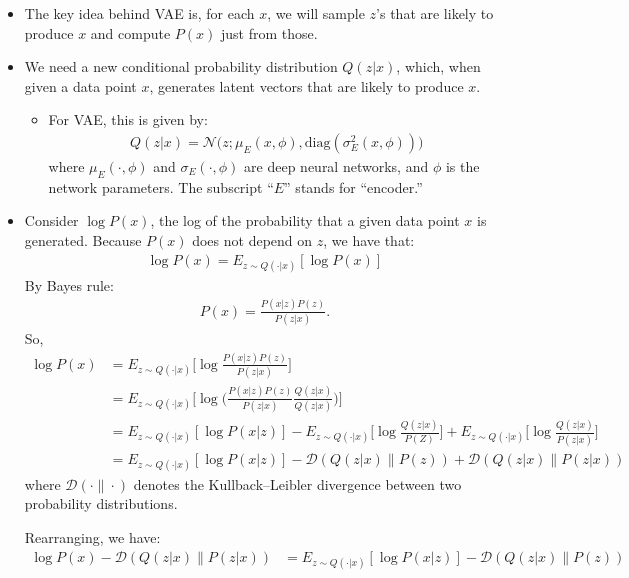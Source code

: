 \documentclass[10pt]{article}
\newcommand{\diag}{\mathrm{diag}}
\begin{document}
  \begin{itemize}
  	\item The key idea behind VAE is, for each $x$, we will sample $z$'s that are likely to produce $x$ and compute $P(x)$ just from those.

  	\item We need a new conditional probability distribution $Q(z|x)$, which, when given a data point $x$, generates latent vectors that are likely to produce $x$.
  	\begin{itemize}
  	  \item For VAE, this is given by:
  	  \begin{align*}
  	  	Q(z|x) = \mathcal{N}\big(z; \mu_E(x,\phi), \diag(\sigma^2_E(x,\phi))\big)
  	  \end{align*}
  	  where $\mu_E(\cdot, \phi)$ and $\sigma_E(\cdot, \phi)$ are deep neural networks, and $\phi$ is the network parameters. The subscript ``$E$'' stands for ``encoder.''
  	\end{itemize}

  	\item Consider $\log P(x)$, the log of the probability that a given data point $x$ is generated. Because $P(x)$ does not depend on $z$, we have that:
  	\begin{align*}
  	  \log P(x) = E_{z \sim Q(\cdot|x)} [\log P(x)]
  	\end{align*}
  	By Bayes rule:
  	\begin{align*}
  	  P(x) = \frac{P(x|z) P(z)}{P(z|x)}.
  	\end{align*}
  	So,
  	\begin{align*}
  	  \log P(x) 
  	  &= E_{z \sim Q(\cdot|x)} \bigg[\log \frac{P(x|z) P(z)}{P(z|x)} \bigg] \\
  	  &= E_{z \sim Q(\cdot|x)} \bigg[\log \bigg( \frac{P(x|z) P(z)}{P(z|x)} \frac{Q(z|x)}{Q(z|x)} \bigg) \bigg] \\
  	  &= E_{z \sim Q(\cdot|x)} [\log P(x|z)]
  	  - E_{z \sim Q(\cdot|x)} \bigg[ \log \frac{Q(z|x)}{P(Z)} \bigg] 
  	  + E_{z \sim Q(\cdot|x)} \bigg[\log \frac{Q(z|x)}{P(z|x)} \bigg]\\
  	  &= E_{z \sim Q(\cdot|x)} [\log P(x|z)] 
  	  - \mathcal{D}(Q(z|x)\|P(z)) + \mathcal{D}(Q(z|x)\| P(z|x))
  	\end{align*}
  	where $\mathcal{D}(\cdot\|\cdot)$ denotes the Kullback--Leibler divergence between two probability distributions.

  	Rearranging, we have:
  	\begin{align*}
  	  \log P(x) - \mathcal{D}(Q(z|x)\| P(z|x))
  	  &= E_{z \sim Q(\cdot|x)} [\log P(x|z)] 
  	  - \mathcal{D}(Q(z|x)\|P(z))
  	\end{align*}


\end{itemize}
\end{document}
